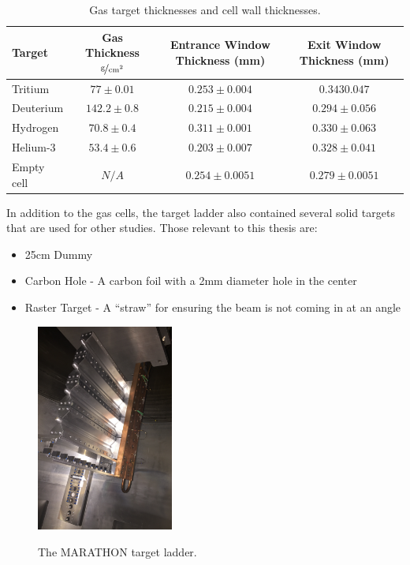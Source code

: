 \begin{table}[h]
\begin{tabular}{|l|c|c|c|}
\hline
Target & Gas Thickness $\nicefrac{\textrm{g}}{\textrm{cm}^2}$ & Entrance Window Thickness (mm) & Exit Window Thickness (mm) \\
\hline
\hline
Tritium & $77\pm0.01$ & $0.253\pm0.004$ & $0.3430.047$\\ \hline
Deuterium & $142.2\pm0.8$ & $0.215\pm0.004$ & $0.294\pm0.056$\\ \hline
Hydrogen & $70.8\pm0.4$ & $0.311\pm0.001$ & $0.330\pm0.063$\\ \hline
Helium-3 & $53.4\pm0.6$ & $0.203\pm0.007$ & $0.328\pm0.041$\\ \hline
Empty cell & $N/A$ & $0.254\pm0.0051$ & $0.279\pm0.0051$\\ \hline
\end{tabular}
\caption{Gas target thicknesses and cell wall thicknesses.\cite{targ_meas}}
\label{tbl:gas_targs}
\end{table}

In addition to the gas cells, the target ladder also contained several solid targets that are used for other studies. Those relevant to this thesis are:
\begin{itemize}
	\item 25cm Dummy
	\item Carbon Hole - A carbon foil with a 2mm diameter hole in the center
	\item Raster Target - A ``straw'' for ensuring the beam is not coming in at an angle
\end{itemize}

\begin{figure}[h]
\begin{center}
	\includegraphics[width=0.4\textwidth]{./setup/fig/target.png}
	\label{fig:target}
	\caption{The MARATHON target ladder.}
\end{center}
\end{figure}

